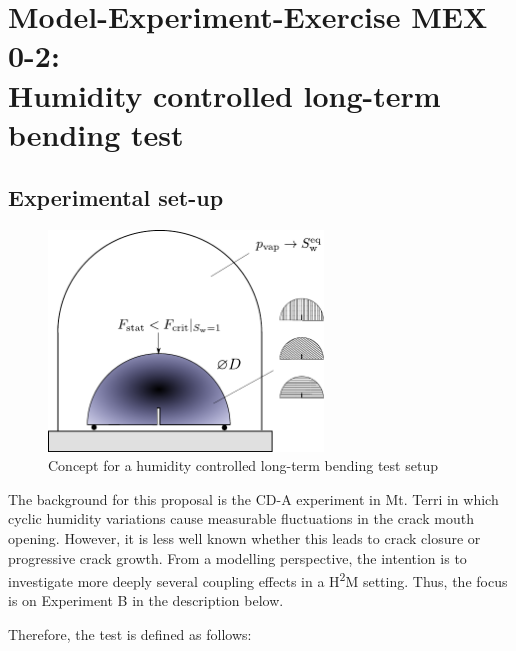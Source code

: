 \section[MEX 0-2: Humidity controlled long-term bending test]{Model-Experiment-Exercise MEX 0-2:\\Humidity controlled long-term bending test}
\label{sec:mex13}
\subsection{Experimental set-up}
\begin{figure}
\centering
\includegraphics[width=7.3cm]{figures/GeomInt_MEx13.pdf}
\caption{Concept for a humidity controlled long-term bending test setup}
\label{fig:GeomInt_MEx13}
\end{figure}
The background for this proposal is the CD-A experiment in Mt. Terri in which cyclic humidity variations cause measurable fluctuations in the crack mouth opening. However, it is less well known whether this leads to crack closure or progressive crack growth. 
%
From a modelling perspective, the intention is to investigate more deeply several coupling effects in a H\textsuperscript{2}M setting. Thus, the focus is on Experiment B in the description below.

Therefore, the test is defined as follows:


